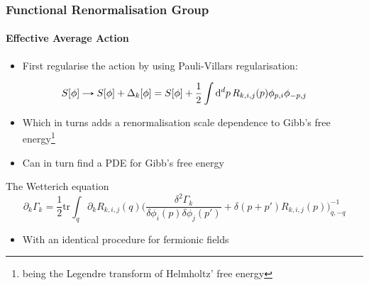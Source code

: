 \documentclass[10pt,a4paper,usenames,dvipsnames]{beamer}
\renewcommand{\rightarrow}{\text{\tikz[baseline=-0.25em]{%
\draw[opacity=0] (-0.1,0) -- (0.5,0);
\draw[->,>=stealth] (0,0) -- (0.4,0);
}}}
\begin{document}
\begin{frame}
  \frametitle{Functional Renormalisation Group}
  \framesubtitle{Effective Average Action}

  \begin{itemize}
    \item First regularise the action by using Pauli-Villars regularisation:
  \end{itemize}
  
  \begin{block}{}
    \begin{equation*}
      S[\phi] \rightarrow S[\phi] + \Delta_k[\phi] = S[\phi] + \frac{1}{2} \int \mathrm{d}^d p \, R_{k,i,j}(p) \phi_{p,i} \phi_{-p,j}
    \end{equation*}
  \end{block}

  \begin{itemize}
    \item Which in turns adds a renormalisation scale dependence to Gibb's free energy\footnote{\tiny being the Legendre transform of
      Helmholtz' free energy}
    \item Can in turn find a PDE for Gibb's free energy
  \end{itemize}

  \begin{block}{The Wetterich equation}
    \begin{equation*}
      \partial_k \Gamma_k = \frac{1}{2} \text{tr} \int_q \partial_k R_{k,i,j}(q) \Big( \frac{\delta^2 \Gamma_k}{\delta \phi_i(p) \delta \phi_j(p')} + 
      \delta(p + p') R_{k,i,j}(p)\Big)^{-1}_{q,-q}
    \end{equation*}
  \end{block}

  \begin{itemize}
    \item With an identical procedure for fermionic fields
  \end{itemize}
\end{frame}
\end{document}
